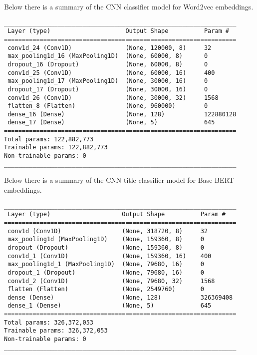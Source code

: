 Below there is a summary of the CNN classifier model for Word2vec embeddings.
\begin{verbatim}
_________________________________________________________________
 Layer (type)                     Output Shape          Param #   
=================================================================
 conv1d_24 (Conv1D)               (None, 120000, 8)     32        
 max_pooling1d_16 (MaxPooling1D)  (None, 60000, 8)      0              
 dropout_16 (Dropout)             (None, 60000, 8)      0         
 conv1d_25 (Conv1D)               (None, 60000, 16)     400       
 max_pooling1d_17 (MaxPooling1D)  (None, 30000, 16)     0               
 dropout_17 (Dropout)             (None, 30000, 16)     0         
 conv1d_26 (Conv1D)               (None, 30000, 32)     1568      
 flatten_8 (Flatten)              (None, 960000)        0         
 dense_16 (Dense)                 (None, 128)           122880128 
 dense_17 (Dense)                 (None, 5)             645       
=================================================================
Total params: 122,882,773
Trainable params: 122,882,773
Non-trainable params: 0
_________________________________________________________________

\end{verbatim}

Below there is a summary of the CNN title classifier model for Base BERT embeddings.
\begin{verbatim}
_________________________________________________________________
 Layer (type)                    Output Shape          Param #   
=================================================================
 conv1d (Conv1D)                 (None, 318720, 8)     32                  
 max_pooling1d (MaxPooling1D)    (None, 159360, 8)     0         
 dropout (Dropout)               (None, 159360, 8)     0                 
 conv1d_1 (Conv1D)               (None, 159360, 16)    400           
 max_pooling1d_1 (MaxPooling1D)  (None, 79680, 16)     0                                     
 dropout_1 (Dropout)             (None, 79680, 16)     0               
 conv1d_2 (Conv1D)               (None, 79680, 32)     1568      
 flatten (Flatten)               (None, 2549760)       0                    
 dense (Dense)                   (None, 128)           326369408          
 dense_1 (Dense)                 (None, 5)             645                                 
=================================================================
Total params: 326,372,053
Trainable params: 326,372,053
Non-trainable params: 0
_________________________________________________________________

\end{verbatim}